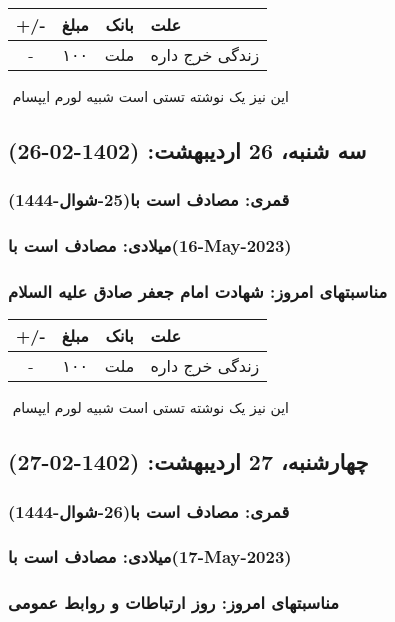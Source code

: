 \documentclass{article}
\newcommand{\rnote}[1]{\marginpar{\textcolor{color}{\StrSubstitute{\##1}{ }{\_}}}}
\newcommand{\myRow}[4]{
    #1 & #2 & #3 & #4 \\ \hline
}
\begin{document}
\begin{tabular}{ | c | c | c | p{5cm} |}
    \hline
    \myRow{ +/- }{مبلغ}{بانک}{علت}
    \myRow{-}{۱۰۰}{ملت}{زندگی خرج داره}
\end{tabular}
\newline
\newline

‌
\rnote{تست}
این نیز یک نوشته تستی است شبیه لورم ایپسام




\newpage
{}
\textcolor{color}{
\section{ سه شنبه، 26 اردیبهشت: (1402-02-26) }
\subsubsection*{قمری: مصادف است با(25-شوال-1444)} 
\subsubsection*{میلادی: مصادف است با(16-May-2023)}
\subsubsection*{مناسبتهای امروز: شهادت امام جعفر صادق علیه السلام}
}


\begin{tabular}{ | c | c | c | p{5cm} |}
    \hline
    \myRow{ +/- }{مبلغ}{بانک}{علت}
    \myRow{-}{۱۰۰}{ملت}{زندگی خرج داره}
\end{tabular}
\newline
\newline

‌
\rnote{تست}
این نیز یک نوشته تستی است شبیه لورم ایپسام




\newpage
{}
\textcolor{color}{
\section{ چهارشنبه، 27 اردیبهشت: (1402-02-27) }
\subsubsection*{قمری: مصادف است با(26-شوال-1444)} 
\subsubsection*{میلادی: مصادف است با(17-May-2023)}
\subsubsection*{مناسبتهای امروز: روز ارتباطات و روابط عمومی}
}
\end{document}

